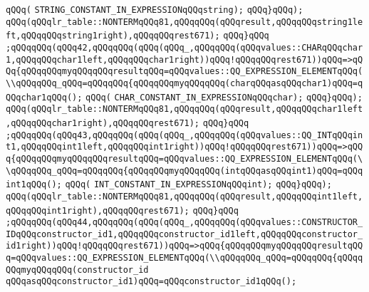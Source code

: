 \verb|qQQq(|\newline
\verb|STRING_CONSTANT_IN_EXPRESSIONqQQqstring);|\newline
\verb|qQQq}qQQq);|\newline
\verb|qQQq(qQQqlr_table::NONTERMqQQq81,qQQqqQQq(qQQqresult,qQQqqQQqstring1left,qQQqqQQqstring1right),qQQqqQQqrest671);|\newline
\verb|qQQq}qQQq|\newline
\verb|;qQQqqQQq(qQQq42,qQQqqQQq(qQQq(qQQq_,qQQqqQQq(qQQqvalues::CHARqQQqchar1,qQQqqQQqchar1left,qQQqqQQqchar1right))qQQq!qQQqqQQqrest671))qQQq=>qQQq{qQQqqQQqmyqQQqqQQqresultqQQq=qQQqvalues::QQ_EXPRESSION_ELEMENTqQQq(\\qQQqqQQq_qQQq=qQQqqQQq{qQQqqQQqmyqQQqqQQq(charqQQqasqQQqchar1)qQQq=qQQqchar1qQQq();|\newline
\verb|qQQq(|\newline
\verb|CHAR_CONSTANT_IN_EXPRESSIONqQQqchar);|\newline
\verb|qQQq}qQQq);|\newline
\verb|qQQq(qQQqlr_table::NONTERMqQQq81,qQQqqQQq(qQQqresult,qQQqqQQqchar1left,qQQqqQQqchar1right),qQQqqQQqrest671);|\newline
\verb|qQQq}qQQq|\newline
\verb|;qQQqqQQq(qQQq43,qQQqqQQq(qQQq(qQQq_,qQQqqQQq(qQQqvalues::QQ_INTqQQqint1,qQQqqQQqint1left,qQQqqQQqint1right))qQQq!qQQqqQQqrest671))qQQq=>qQQq{qQQqqQQqmyqQQqqQQqresultqQQq=qQQqvalues::QQ_EXPRESSION_ELEMENTqQQq(\\qQQqqQQq_qQQq=qQQqqQQq{qQQqqQQqmyqQQqqQQq(intqQQqasqQQqint1)qQQq=qQQqint1qQQq();|\newline
\verb|qQQq(|\newline
\verb|INT_CONSTANT_IN_EXPRESSIONqQQqint);|\newline
\verb|qQQq}qQQq);|\newline
\verb|qQQq(qQQqlr_table::NONTERMqQQq81,qQQqqQQq(qQQqresult,qQQqqQQqint1left,qQQqqQQqint1right),qQQqqQQqrest671);|\newline
\verb|qQQq}qQQq|\newline
\verb|;qQQqqQQq(qQQq44,qQQqqQQq(qQQq(qQQq_,qQQqqQQq(qQQqvalues::CONSTRUCTOR_IDqQQqconstructor_id1,qQQqqQQqconstructor_id1left,qQQqqQQqconstructor_id1right))qQQq!qQQqqQQqrest671))qQQq=>qQQq{qQQqqQQqmyqQQqqQQqresultqQQq=qQQqvalues::QQ_EXPRESSION_ELEMENTqQQq(\\qQQqqQQq_qQQq=qQQqqQQq{qQQqqQQqmyqQQqqQQq(constructor_id|\newline
\verb|qQQqasqQQqconstructor_id1)qQQq=qQQqconstructor_id1qQQq();|\newline

